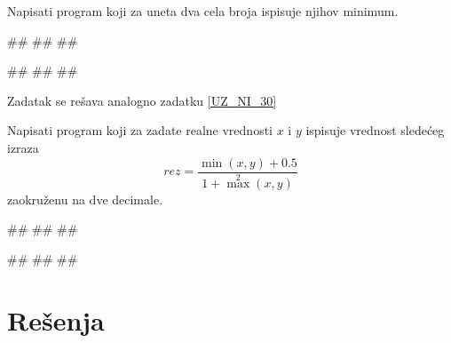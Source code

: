\begin{Exercise}[label=UZ_NI_31]
Napisati program koji za uneta dva cela broja ispisuje njihov minimum. 

\begin{miditest}
\begin{upotreba}{1}
#\naslovInt#
##
##
\end{upotreba}
\end{miditest}
\begin{miditest}
\begin{upotreba}{2}
#\naslovInt#
##
##
\end{upotreba}
\end{miditest}

\end{Exercise}
\ifresenja
\begin{Answer}[ref=UZ_NI_31]

Zadatak se rešava analogno zadatku \ref{UZ_NI_30}
\end{Answer}
\fi


\begin{Exercise}[label=UZ_NI_32]
Napisati program koji za zadate realne vrednosti $x$ i $y$ ispisuje vrednost sledećeg izraza
$$rez = \frac{\min(x, y) + 0.5}{1 + \max^2(x, y)}$$ zaokruženu na dve decimale. 

\begin{miditest}
\begin{upotreba}{1}
#\naslovInt#
##
##
\end{upotreba}
\end{miditest}
\begin{miditest}
\begin{upotreba}{1}
#\naslovInt#
##
##
\end{upotreba}
\end{miditest}

\end{Exercise}
\ifresenja
\begin{Answer}[ref=UZ_NI_32]
\end{Answer}
\fi


\ifresenja
\section{Rešenja}
\shipoutAnswer
\fi
